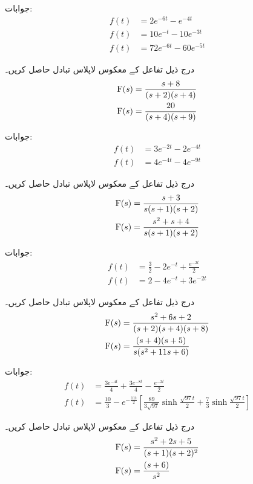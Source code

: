 جوابات:
\begin{align*}
f(t)&=2e^{-6t}-e^{-4t}\\
f(t)&=10e^{-t}-10e^{-3t}\\
f(t)&=72e^{-6t}-60e^{-5t}
\end{align*}


درج ذیل تفاعل کے معکوس لاپلاس تبادل حاصل کریں۔
\begin{align*}
{\ensuremath{{\textup{F}}}}(s)&=\frac{s+8}{(s+2)(s+4)}\\
{{\textup{F}}}(s)&=\frac{20}{(s+4)(s+9)}
\end{align*}

جوابات:
\begin{align*}
f(t)&=3e^{-2t}-2e^{-4t}\\
f(t)&=4e^{-4t}-4e^{-9t}
\end{align*}

درج ذیل تفاعل کے معکوس لاپلاس تبادل حاصل کریں۔
\begin{align*}
{\ensuremath{{\textup{F}}}}(s)&=\frac{s+3}{s(s+1)(s+2)}\\
{{\textup{F}}}(s)&=\frac{s^2+s+4}{s(s+1)(s+2)}
\end{align*}

جوابات:
\begin{align*}
f(t)&=\frac{3}{2}-2e^{-t}+\frac{e^{-2t}}{2}\\
f(t)&=2-4e^{-t}+3e^{-2t}
\end{align*}

درج ذیل تفاعل کے معکوس لاپلاس تبادل حاصل کریں۔
\begin{align*}
{\ensuremath{{\textup{F}}}}(s)&=\frac{s^2+6s+2}{(s+2)(s+4)(s+8)}\\
{{\textup{F}}}(s)&=\frac{(s+4)(s+5)}{s(s^2+11s+6)}
\end{align*}

جوابات:
\begin{align*}
f(t)&=\frac{3e^{-4t}}{4}+\frac{3e^{-8t}}{4}-\frac{e^{-2t}}{2}\\
f(t)&=\frac{10}{3}-e^{-\frac{11t}{2}}\left[\frac{89}{3\sqrt{97}}\sinh \frac{\sqrt{97}t}{2}+\frac{7}{3}\sinh \frac{\sqrt{97}t}{2}\right]
\end{align*}

درج ذیل تفاعل کے معکوس لاپلاس تبادل حاصل کریں۔
\begin{align*}
{\ensuremath{{\textup{F}}}}(s)&=\frac{s^2+2s+5}{(s+1)(s+2)^2}\\
{{\textup{F}}}(s)&=\frac{(s+6)}{s^2}
\end{align*}

